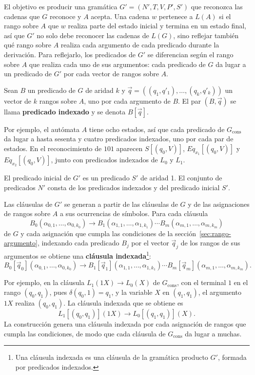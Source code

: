 El objetivo es producir una gramática $G' = (N', T, V, P', S')$ que
reconozca las cadenas que $G$ reconoce y $A$ acepta. Una cadena $w$
pertenece a $L(A)$ si el
rango sobre $A$ que $w$ realiza parte del estado inicial y termina en
un estado final, así que $G'$ no solo debe reconocer las cadenas de
$L(G)$, sino reflejar también qué rango sobre $A$ realiza cada
argumento de cada predicado durante la derivación. Para reflejarlo,
los predicados de $G'$ se diferencian según el rango sobre $A$ que
realiza cada uno de sus argumentos: cada predicado de $G$ da lugar a
un predicado de $G'$ por cada vector de rangos sobre $A$.

\begin{definicion}
Sean $B$ un predicado de $G$ de aridad $k$ y
$\vec q = ((q_1, q'_1), \ldots, (q_k, q'_k))$ un vector de $k$ rangos
sobre $A$, uno por cada argumento de $B$. El par $(B, \vec q)$ se
llama \textbf{predicado indexado} y se denota $B[\vec q]$.
\end{definicion}

Por ejemplo, el autómata $A$ tiene ocho estados, así que cada predicado
de $G_{\mathrm{cons}}$ da lugar a hasta sesenta y cuatro predicados
indexados, uno por cada par de estados. En el reconocimiento de $101$
aparecen $S[(q_0, V)]$,
$Eq_{x_1}[(q_0, V)]$ y $Eq_{x_2}[(q_0, V)]$, junto con predicados
indexados de $L_0$ y $L_1$.

El predicado inicial de $G'$ es un predicado $S'$ de aridad 1. El
conjunto de predicados $N'$ consta de los predicados indexados y del
predicado inicial $S'$.

Las cláusulas de $G'$ se generan a partir de las cláusulas de $G$ y de
las asignaciones de rangos sobre $A$ a sus ocurrencias de símbolos. Para
cada cláusula
\[
  B_0(\alpha_{0,1}, \ldots, \alpha_{0,k_0}) \to
  B_1(\alpha_{1,1}, \ldots, \alpha_{1,k_1}) \cdots
  B_m(\alpha_{m,1}, \ldots, \alpha_{m,k_m})
\]
de $G$ y cada asignación que cumpla las condiciones de la
sección~\ref{sec:rango-argumento}, indexando cada predicado $B_j$ por el
vector $\vec q_j$ de los rangos de sus argumentos se obtiene una
\textbf{cláusula indexada}\footnote{Una cláusula indexada es una
cláusula de la gramática producto $G'$, formada por predicados
indexados.}:
\[
  B_0[\vec q_0](\alpha_{0,1}, \ldots, \alpha_{0,k_0}) \to
  B_1[\vec q_1](\alpha_{1,1}, \ldots, \alpha_{1,k_1}) \cdots
  B_m[\vec q_m](\alpha_{m,1}, \ldots, \alpha_{m,k_m}).
\]

Por ejemplo, en la cláusula $L_1(1X) \to L_0(X)$ de $G_{\mathrm{cons}}$,
con el terminal $1$ en el rango $(q_0, q_1)$, pues $\delta(q_0, 1) = q_1$,
y la variable $X$ en $(q_1, q_1)$, el argumento $1X$ realiza $(q_0, q_1)$. La
cláusula indexada que se obtiene es
\[
  L_1[(q_0, q_1)](1X) \to L_0[(q_1, q_1)](X).
\]
La construcción genera una cláusula indexada por cada asignación de
rangos que cumpla las condiciones, de modo que cada cláusula de
$G_{\mathrm{cons}}$ da lugar a muchas.

